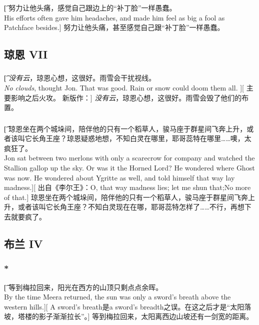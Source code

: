 \documentclass[12pt,a4paper]{article}
\begin{document}
\subsubsection{}\t[
	努力让他头痛，感觉自己跟边上的“补丁脸”一样愚蠢。\\
	His efforts often gave him headaches, and made him feel as big a fool as Patchface besides.]
	努力让他头痛，甚至感觉自己跟“补丁脸”一样愚蠢。
	
\subsection{琼恩 VII}
\subsubsection{}\t[
	\emph{没有云}，琼恩心想，这很好。雨雪会干扰视线。\\
	\emph{No clouds}, thought Jon. That was good. Rain or snow could doom them all. ][
		主要影响之后火攻。	新版作：]
		\emph{没有云}，琼恩心想，这很好。雨雪会毁了他们的布置。

\subsubsection{}\t[
琼恩坐在两个城垛间，陪伴他的只有一个稻草人，骏马座于群星间飞奔上升，或者该叫它长角王座？琼恩疑惑地想，不知白灵在哪里，耶哥蕊特在哪里……噢，太疯狂了。\\
Jon sat between two merlons with only a scarecrow for company and watched the Stallion gallop up the sky. Or was it the Horned Lord? He wondered where Ghost was now. He wondered about Ygritte as well, and told himself that way lay madness.][
出自《李尔王》：O, that way madness lies; let me shun that;No more of that.]
琼恩坐在两个城垛间，陪伴他的只有一个稻草人，骏马座于群星间飞奔上升，或者该叫它长角王座？不知白灵现在在哪，耶哥蕊特怎样了……不行，再想下去就要疯了。
	
\subsection{布兰 IV}

\subsubsection{\color{red}*}\t[
等到梅拉回来，阳光在西方的山顶只剩点点余晖。\\
By the time Meera returned, the sun was only a sword's breath above the western hills.][
A sword's breath是a sword's breadth之误。在这之后才是“太阳落坡，塔楼的影子渐渐拉长”。]
等到梅拉回来，太阳离西边山坡还有一剑宽的距离。
\end{document}
